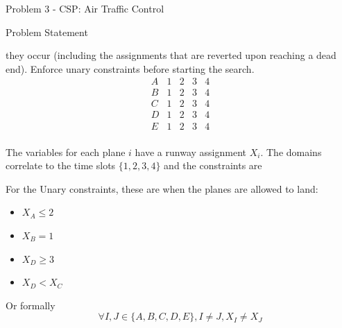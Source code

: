 \begin{problem}{Problem 3 - CSP: Air Traffic Control}
\begin{statement}{Problem Statement}
\begin{enumerate}[label=\textbf{(\alph*)}]
\begin{enumerate}[label=\textbf{(\roman*)}]
                they occur (including the assignments that are reverted upon reaching a dead end). Enforce unary constraints before starting the search.
                \begin{equation*}
                    \begin{array}{c|cccc}
                        A & 1 & 2 & 3 & 4 \\
                        B & 1 & 2 & 3 & 4 \\
                        C & 1 & 2 & 3 & 4 \\
                        D & 1 & 2 & 3 & 4 \\
                        E & 1 & 2 & 3 & 4 \\
                    \end{array}
                \end{equation*}
            \end{enumerate}
        \end{enumerate}
    \end{statement}

    \clearpage

    \begin{highlight}
        The variables for each plane $i$ have a runway assignment $X_{i}$. The domains correlate to the time slots $\{1,2,3,4\}$ and the constraints are 

        \begin{center}
            \begin{highlightbox}
            \end{highlightbox}
        \end{center}
        For the Unary constraints, these are when the planes are allowed to land:

        \begin{center}
            \begin{highlightenv}[10cm]
                \begin{itemize}
                    \item $X_{A} \leq 2$
                    \item $X_{B} = 1$
                    \item $X_{D} \geq 3$
                    \item $X_{D} < X_{C}$
                \end{itemize}
                \vspace*{1em}
                Or formally
                \begin{equation*}
                    \forall I,J \in \{A,B,C,D,E\}, I \neq J, X_{I} \neq X_{J}
                \end{equation*}
            \end{highlightenv}
        \end{center}
    \end{highlight}


\end{problem}
